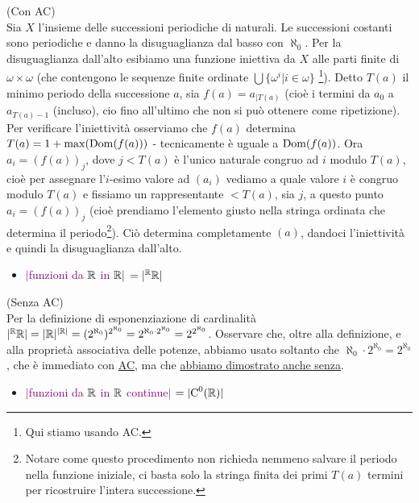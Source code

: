 \begin{soln}
	(Con AC)\\
	Sia $X$ l'insieme delle successioni periodiche di naturali. Le successioni costanti sono periodiche e danno la disuguaglianza dal basso con $\aleph_0$. Per la disuguaglianza dall'alto esibiamo una funzione iniettiva da $X$ alle parti finite di $\omega \times \omega$ (che contengono le sequenze finite ordinate $\bigcup\{\omega^i |i \in \omega\}$ \footnote{Qui stiamo usando AC.}).
	Detto $T(a)$ il minimo periodo della successione $a$, sia $f(a) = a_{|T(a)}$ (cioè i termini da $a_0$ a $a_{T(a)-1}$ (incluso), cio fino all'ultimo che non si può ottenere come ripetizione).\\
	Per verificare l'iniettività osserviamo che $f(a)$ determina $T(a) = 1 + \max(\operatorname{Dom}(f(a)))$ - tecnicamente è uguale a $\operatorname{Dom}(f(a))$. Ora $a_i = (f(a))_j$, dove $j < T(a)$ è l'unico naturale congruo ad $i$ modulo $T(a)$, cioè per assegnare l'$i$-esimo valore ad $(a_i)$ vediamo a quale valore $i$ è congruo modulo $T(a)$ e fissiamo un rappresentante $<T(a)$, sia $j$, a questo punto
	$a_i = (f(a))_j$ (cioè prendiamo l'elemento giusto nella stringa ordinata che determina il periodo\footnote{Notare come questo procedimento non richieda nemmeno salvare il periodo nella funzione iniziale, ci basta solo la stringa finita dei primi $T(a)$ termini per ricostruire l'intera successione.}).
    Ciò determina completamente $(a)$, dandoci l'iniettività e quindi la disuguaglianza dall'alto.
\end{soln}

\begin{itemize}
	\item \textcolor{purple}{$|$funzioni da $\mathbb R$ in $\mathbb R|$ $= |{}^\mathbb R\mathbb R|$}
\end{itemize}

\begin{soln}
	(Senza AC)\\
	Per la definizione di esponenziazione di cardinalità $|{}^\mathbb R\mathbb R| = |\mathbb R|^{|\mathbb R|} = (2^{\aleph_0})^{2^{\aleph_0}} = 2^{\aleph_0 \cdot 2^{\aleph_0}} = 2^{2^{\aleph_0}}$. Osservare che, oltre alla definizione,
	e alla proprietà associativa delle potenze, abbiamo usato soltanto che $\aleph_0 \cdot 2^{\aleph_0} = 2^{\aleph_0}$, che è immediato con \hyperref[ax9]{AC}, ma che \hyperref[prodotto_cardinali_senza_AC]{abbiamo dimostrato anche senza}.
\end{soln}

\begin{itemize}
	\item \textcolor{purple}{$|$funzioni da $\mathbb R$ in $\mathbb R$ continue$|$ $= |\text{C}^0(\mathbb R)|$}
\end{itemize}

